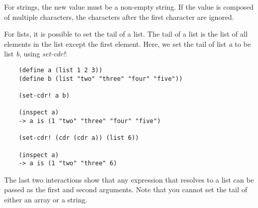 For strings, the new value must be a non-empty string. If the
value is composed of multiple characters, the characters after
the first character are ignored.

For lists, it is possible to set the tail of a list. 
The tail of a list is the list of all elements in the list 
except the first element. Here, we set the tail of list {\it a}
to be list {\it b}, using {\it set-cdr!}:

\begin{verbatim}
    (define a (list 1 2 3))
    (define b (list "two" "three" "four" "five"))

    (set-cdr! a b)
    
    (inspect a)
    -> a is (1 "two" "three" "four" "five")

    (set-cdr! (cdr (cdr a)) (list 6))

    (inspect a)
    -> a is (1 "two" "three" 6)
\end{verbatim}

The last two interactions show that any expression that resolves
to a list can be passed as the first and second arguments.
Note that you cannot set the tail of either an array or a string.
